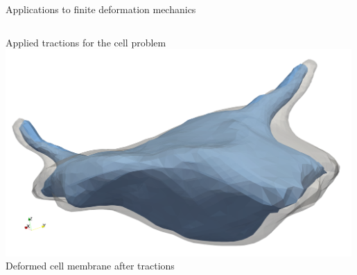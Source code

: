 \documentclass[fleqn]{beamer}
\begin{document}
\begin{frame}{Applications to finite deformation mechanics}
\begin{columns}
\begin{column}{0.5\textwidth}
Applied tractions for the cell problem
\includegraphics[width=0.99\textwidth]{../img/mech_glial_deformed} \\
Deformed cell membrane after tractions
\end{column}
\end{columns}
\end{frame}

\end{document}
